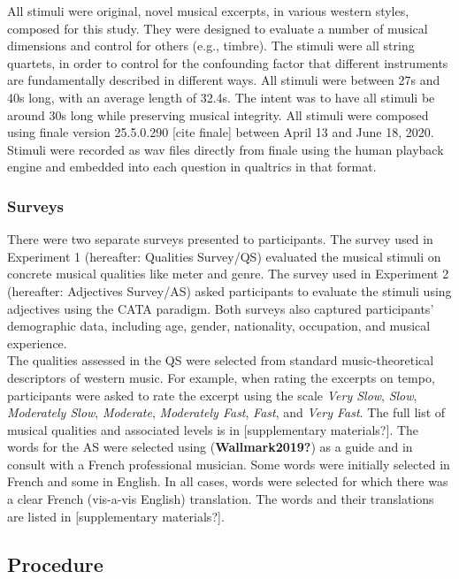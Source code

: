 \documentclass[
  english,
  man,floatsintext]{apa6}
\begin{document}
All stimuli were original, novel musical excerpts, in various western styles, composed for this study. They were designed to evaluate a number of musical dimensions and control for others (e.g., timbre). The stimuli were all string quartets, in order to control for the confounding factor that different instruments are fundamentally described in different ways. All stimuli were between 27s and 40s long, with an average length of 32.4s. The intent was to have all stimuli be around 30s long while preserving musical integrity. All stimuli were composed using finale version 25.5.0.290 {[}cite finale{]} between April 13 and June 18, 2020. Stimuli were recorded as wav files directly from finale using the human playback engine and embedded into each question in qualtrics in that format.

\hypertarget{surveys}{%
\subsubsection{Surveys}\label{surveys}}

There were two separate surveys presented to participants. The survey used in Experiment 1 (hereafter: Qualities Survey/QS) evaluated the musical stimuli on concrete musical qualities like meter and genre. The survey used in Experiment 2 (hereafter: Adjectives Survey/AS) asked participants to evaluate the stimuli using adjectives using the CATA paradigm. Both surveys also captured participants' demographic data, including age, gender, nationality, occupation, and musical experience.\\
The qualities assessed in the QS were selected from standard music-theoretical descriptors of western music. For example, when rating the excerpts on tempo, participants were asked to rate the excerpt using the scale \emph{Very Slow}, \emph{Slow}, \emph{Moderately Slow}, \emph{Moderate}, \emph{Moderately Fast}, \emph{Fast}, and \emph{Very Fast}. The full list of musical qualities and associated levels is in {[}supplementary materials?{]}. The words for the AS were selected using (\textbf{Wallmark2019?}) as a guide and in consult with a French professional musician. Some words were initially selected in French and some in English. In all cases, words were selected for which there was a clear French (vis-a-vis English) translation. The words and their translations are listed in {[}supplementary materials?{]}.

\hypertarget{procedure}{%
\subsection{Procedure}\label{procedure}}
\end{document}
